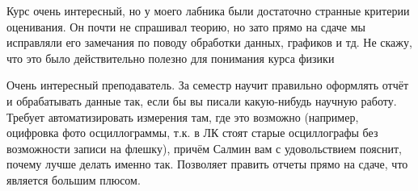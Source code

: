                 \begin{commentbox} 
                    Курс очень интересный, но у моего лабника были достаточно странные критерии оценивания. Он почти не спрашивал теорию, но зато прямо на сдаче мы исправляли его замечания по поводу обработки данных, графиков и тд. Не скажу, что это было действительно полезно для понимания курса физики 
                \end{commentbox} 

                \begin{commentbox} 
                    Очень интересный преподаватель. За семестр научит правильно оформлять отчёт и обрабатывать данные так, если бы вы писали какую-нибудь научную работу. Требует автоматизировать измерения там, где это возможно (например, оцифровка фото осциллограммы, т.к. в ЛК стоят старые осциллографы без возможности записи на флешку), причём Салмин вам с удовольствием пояснит, почему лучше делать именно так. Позволяет править отчеты прямо на сдаче, что является большим плюсом. 
                \end{commentbox}


                
